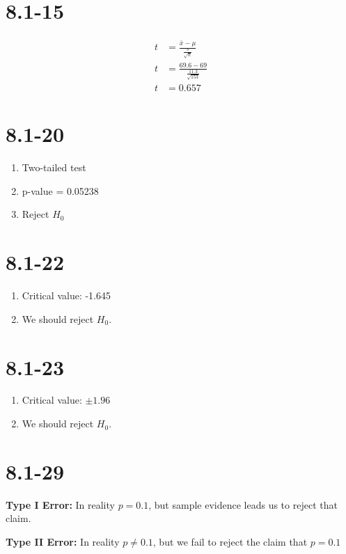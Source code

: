 \documentclass[12pt,fleqn]{article}
\newcommand{\chapter}{8.1}
\newcommand{\problem}[1]{\vspace{5ex}\section*{\chapter-#1}}
\begin{document}
\problem{15}
\begin{align*}
  t &= \frac{\bar{x} - \mu}{\frac{s}{\sqrt{n}}} \\
  t &= \frac{69.6 - 69}{\frac{11.3}{\sqrt{153}}} \\
  t &= 0.657
\end{align*}


\problem{20}
\begin{enumerate}[label=\alph*.]
\item Two-tailed test
\item p-value = 0.05238
\item Reject $H_0$
\end{enumerate}


\problem{22}
\begin{enumerate}[label=\alph*.]
\item Critical value: -1.645
\item We should reject $H_0$.
\end{enumerate}


\problem{23}
\begin{enumerate}[label=\alph*.]
\item Critical value: $\pm 1.96$
\item We should reject $H_0$.
\end{enumerate}


\problem{29}
\textbf{Type I Error:} In reality $p = 0.1$, but sample evidence leads us to reject that claim.

\textbf{Type II Error:} In reality $p \ne 0.1$, but we fail to reject the claim that $p = 0.1$
\end{document}
